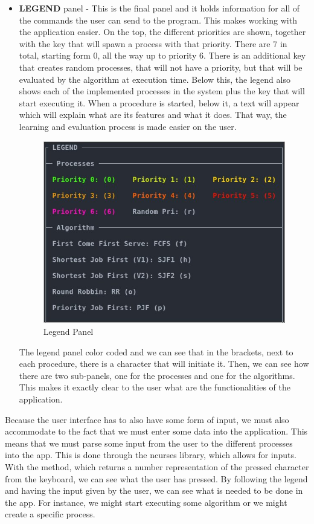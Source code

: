 \documentclass{article}
\newcommand{\code}[1]{\codeinline{\texttt{#1}}}
\begin{document}
\begin{itemize}
\item \textbf{LEGEND} panel - This is the final panel and it holds information for all of the commands the user can send to the program. This makes working with the application easier. On the top, the different priorities are shown, together with the key that will spawn a process with that priority. There are 7 in total, starting form 0, all the way up to priority 6. There is an additional key that creates random processes, that will not have a priority, but that will be evaluated by the algorithm at execution time. Below this, the legend also shows each of the implemented processes in the system plus the key that will start executing it. When a procedure is started, below it, a text will appear which will explain what are its features and what it does. That way, the learning and evaluation process is made easier on the user.

  \begin{figure}[H]
    \includegraphics[width=\linewidth]{./pics/legend.jpg}
    \caption{Legend Panel}
    \label{fig:Legend Panel}
  \end{figure}

  The legend panel color coded and we can see that in the brackets, next to each procedure, there is a character that will initiate it. Then, we can see how there are two sub-panels, one for the processes and one for the algorithms. This makes it exactly clear to the user what are the functionalities of the application.

\end{itemize}

Because the user interface has to also have some form of input, we must also accommodate to the fact that we must enter some data into the application. This means that we must parse some input from the user to the different processes into the app. This is done through the ncurses library, which allows for inputs. With the \code{getch()} method, which returns a number representation of the pressed character from the keyboard, we can see what the user has pressed. By following the legend and having the input given by the user, we can see what is needed to be done in the app. For instance, we might start executing some algorithm or we might create a specific process.
\end{document}
